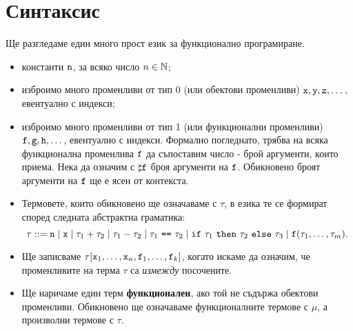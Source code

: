 \section{Синтаксис}
Ще разгледаме един много прост език за функционално програмиране.
\begin{itemize}
\item
  константи $\texttt{n}$, за всяко число $n \in \mathbb{N}$;
\item
  изброимо много променливи от тип 0 (или обектови променливи) $\texttt{x}, \texttt{y}, \texttt{z}, \dots$, евентуално с индекси;
\item
  изброимо много променливи от тип 1 (или функционални променливи) $\texttt{f},\texttt{g},\texttt{h},\dots$, евентуално с индекси. 
  Формално погледнато, трябва на всяка функционална променлива $\texttt{f}$
  да съпоставим число - брой аргументи, които приема. Нека да означим с $\sharp\texttt{f}$ броя аргументи на $\texttt{f}$.
  Обикновено броят аргументи на $\texttt{f}$ ще е ясен от контекста.
\item
  Термовете, които обикновено ще означаваме с $\tau$, в езика \FUN те се формират според следната абстрактна граматика:
  \[\tau ::= \texttt{n} \mid \texttt{x} \mid \tau_1 + \tau_2 \mid \tau_1 - \tau_2 \mid \tau_1\ \texttt{==}\ \tau_2 \mid \texttt{if}\ \tau_1\ \texttt{then}\ \tau_2\ \texttt{else}\ \tau_3 \mid \texttt{f}(\tau_1,\dots,\tau_m).\]
\item
  Ще записваме $\tau[\texttt{x}_1,\dots,\texttt{x}_n,\texttt{f}_1,\dots,\texttt{f}_k]$, когато искаме да означим, че променливите
  на терма $\tau$ са {\em измежду} посочените.
\item
  Ще наричаме един терм {\bf функционален}, ако той не съдържа обектови променливи.
  Обикновено ще означаваме функционалните термове с $\mu$, а произволни термове с $\tau$.

\end{itemize}
